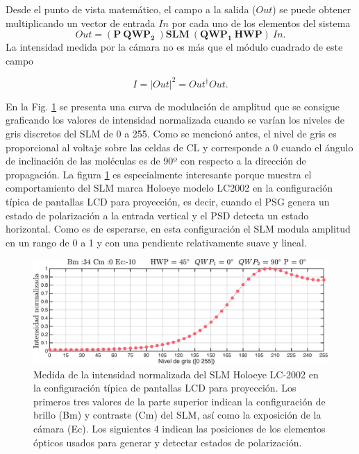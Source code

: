 Desde el punto de vista matemático, el campo a la salida ($Out$) se puede
obtener multiplicando un vector de entrada $In$ por cada uno de
los elementos del sistema 
\begin{equation}
\label{eq:ChGV_Out}
Out = \left( \mathbf{P}\ \mathbf{QWP_2}\ \right) \mathbf{SLM}\ \left( \mathbf{QWP_1}\
\mathbf{HWP}\right)\ In.
\end{equation}
La intensidad medida por la cámara no es más que el módulo cuadrado de
este campo

\begin{equation}
I = |Out|^2 = Out^{\dagger}Out.
\end{equation}

En la Fig. \ref{fig:amp_H_V_SLM_2002} se presenta
una curva de modulación de amplitud que se consigue graficando los
valores de intensidad normalizada cuando se varían los niveles de gris discretos
del SLM de 0 a 255. Como se mencionó antes, el nivel de gris es
proporcional al voltaje sobre las celdas de CL y corresponde a 0
cuando el ángulo de inclinación de las moléculas es de 90º con
respecto a la dirección de propagación. La
figura \ref{fig:amp_H_V_SLM_2002} es especialmente interesante porque
muestra el comportamiento del SLM marca Holoeye modelo LC2002 en la
configuración típica de pantallas LCD para proyección, es decir, cuando
el PSG genera un estado de polarización a la entrada vertical y el
PSD detecta un estado horizontal. Como es de esperarse, en esta
configuración el SLM modula amplitud en un rango de 0 a 1 y con una
pendiente relativamente suave y lineal. 
\begin{figure}[h!]
\centering
\includegraphics[scale=.55]{amp_H_V_SLM_2002.pdf}
\caption[Curva de modulación de amplitud para un estado no
óptimo]{Medida de la intensidad normalizada del SLM Holoeye LC-2002 en la configuración típica
  de pantallas LCD para proyección. Los primeros tres valores de la parte superior indican la
configuración de brillo (Bm) y contraste (Cm) del SLM, así como la
exposición de la cámara (Ec). Los siguientes 4 indican las posiciones
de los elementos ópticos usados para generar y detectar
estados de polarización.}
\label{fig:amp_H_V_SLM_2002}
\end{figure}
